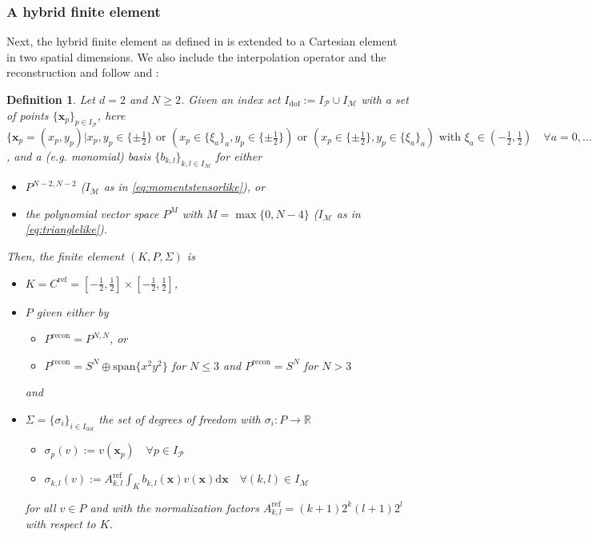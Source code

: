\documentclass[12pt,a4paper]{article}
\newtheorem{definition}{Definition}
\begin{document}
\subsubsection{A hybrid finite element}
Next, the hybrid finite element as defined in \cite[Definition 3.1]{AB2023FEFV} is extended to a Cartesian element in two spatial dimensions. 
We also include the interpolation operator and the reconstruction and follow \cite[Definitions 5.2, 5.5, 5.7, 5.11, Proposition 5.12]{ErnGuermond2021} and \cite{AB2023FEFV}:
\begin{definition}\label{Def_FE}
Let $d=2$ and $N \geq 2$. Given an index set \(I_\mathrm{dof} := I_{\mathcal P} \cup I_{\mathcal M}\) with a set of points \(\{\mathbf x_p\}_{p \in I_{\mathcal P}}\), 
here \(\{\mathbf x_p = (x_p,y_p) | x_p, y_p \in \{\pm \tfrac{1}{2}\} \text{ or } (x_p \in \{\xi_a\}_a , y_p \in \{\pm \tfrac{1}{2}\}) \text{ or } (x_p \in \{\pm \tfrac{1}{2}\} , y_p \in \{\xi_a\}_a) \text{ with } \xi_a \in (-\tfrac{1}{2}, \tfrac{1}{2}) \quad \forall a = 0, \dots, N-2 \}\), and a (e.g. monomial) basis \(\{b_{k,l}\}_{k,l \in I_{\mathcal M}}\) for either
\begin{itemize}
	\item $P^{N-2,N-2}$ ($I_{\mathcal M}$ as in \eqref{eq:momentstensorlike}), or
	\item the polynomial vector space $P^{M}$ with $M = \max\{0, N-4\}$ ($I_{\mathcal M}$ as in \eqref{eq:trianglelike}).
\end{itemize}
Then, the finite element \((K, P, \Sigma)\) is 
\begin{itemize}
	\item \(K = C^\mathrm{ref} = \left[-\frac12, \frac12\right]\times\left[-\frac12, \frac12\right]\),
	\item $P$ given either by
	\begin{itemize}
		\item $P^\mathrm{recon} = P^{N,N}$, or
		\item $P^\mathrm{recon}=S^N \oplus \mathrm{span}\{x^2y^2\}$ for $N \leq 3$ and \(P^\mathrm{recon}=S^N\) for $N > 3$
	\end{itemize}
	and
	\item{$\Sigma =\{\sigma_i\}_{i \in I_\mathrm{dof}}$ the set of degrees of freedom with \(\sigma_i: P\rightarrow \mathbb R\)
	\begin{itemize}
		\item[]{\(\sigma_p(v) := v(\mathbf x_p) \quad \forall  p \in I_{\mathcal P}\)}
		\item[]{\(\sigma_{k,l}(v) := A^\mathrm{ref}_{k,l}\int_{K} b_{k,l}(\mathbf x) v(\mathbf x) \mathrm d \mathbf x \quad \forall (k,l) \in I_{\mathcal M}\)}
	\end{itemize}
	for all $v \in P$ and with the normalization factors \(A_{k,l}^\mathrm{ref}= (k+1)2^k(l+1)2^l\) with respect to $K$.
}
\end{itemize}
\end{definition}
\end{document}
